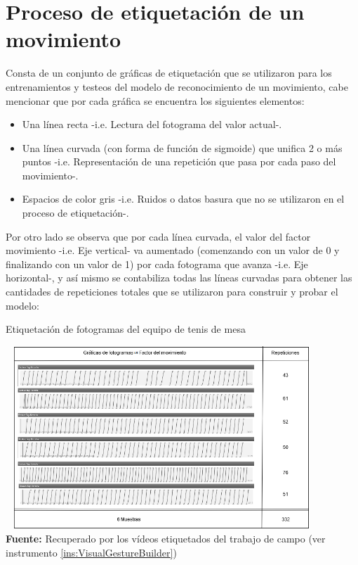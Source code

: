 \section{Proceso de etiquetaci\'on de un movimiento}
Consta de un conjunto de gr\'aficas de etiquetaci\'on que se utilizaron para los entrenamientos y testeos del modelo de reconocimiento de un  movimiento, cabe mencionar que por cada gr\'afica se encuentra los siguientes elementos:
\begin{itemize}
\item Una l\'inea recta -i.e. Lectura del fotograma del valor actual-.
\item Una l\'inea curvada (con forma de funci\'on de sigmoide) que unifica 2 o m\'as puntos -i.e. Representaci\'on de una repetici\'on que pasa por cada paso del movimiento-.
\item Espacios de color gris -i.e. Ruidos o datos basura que no se utilizaron en el proceso de etiquetaci\'on-.
\end{itemize}
Por otro lado se observa que por cada l\'inea curvada, el valor del factor movimiento -i.e. Eje vertical- va aumentado (comenzando con un valor de 0 y finalizando con un valor de 1) por cada fotograma que avanza -i.e. Eje horizontal-, y as\'i mismo se contabiliza todas las l\'ineas curvadas para obtener las cantidades de repeticiones totales que se utilizaron para construir y probar el modelo: 
\begin{chart}[H]
	\caption{Etiquetaci\'on de fotogramas del equipo de tenis de mesa}
	\label{fig:etiquetaTenis}
	\centering
	\includegraphics[width=445px,height=260px]{graphics/resultados/GraSegTenisDeMesa.PNG} \\
	\textbf{Fuente:} Recuperado por los v\'ideos etiquetados del trabajo de campo (ver instrumento \ref{ins:VisualGestureBuilder})
\end{chart}
